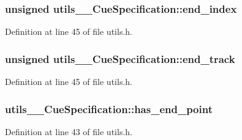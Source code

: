 \subsubsection[{\texorpdfstring{end\+\_\+index}{end_index}}]{\setlength{\rightskip}{0pt plus 5cm}unsigned utils\+\_\+\+\_\+\+Cue\+Specification\+::end\+\_\+index}\hypertarget{structutils_____cue_specification_a0ad9e9085e44a9672537a1a932e5f517}{}\label{structutils_____cue_specification_a0ad9e9085e44a9672537a1a932e5f517}


Definition at line 45 of file utils.\+h.

\subsubsection[{\texorpdfstring{end\+\_\+track}{end_track}}]{\setlength{\rightskip}{0pt plus 5cm}unsigned utils\+\_\+\+\_\+\+Cue\+Specification\+::end\+\_\+track}\hypertarget{structutils_____cue_specification_a0f1060c9d1cfc542fc8d551133560540}{}\label{structutils_____cue_specification_a0f1060c9d1cfc542fc8d551133560540}


Definition at line 45 of file utils.\+h.

\subsubsection[{\texorpdfstring{has\+\_\+end\+\_\+point}{has_end_point}}]{ utils\+\_\+\+\_\+\+Cue\+Specification\+::has\+\_\+end\+\_\+point}\hypertarget{structutils_____cue_specification_ab737b2555e312a8e7fe84dace304773e}{}\label{structutils_____cue_specification_ab737b2555e312a8e7fe84dace304773e}


Definition at line 43 of file utils.\+h.

